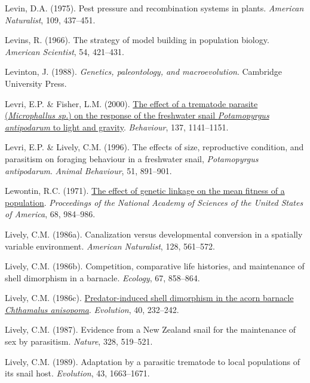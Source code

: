 \documentclass[
  american,
  letterpaper,
]{book}
\newlength{\cslhangindent}
\newenvironment{CSLReferences}[2] %
 {\begin{list}{}{%
  \setlength{\itemindent}{0pt}
  \setlength{\leftmargin}{0pt}
  \setlength{\parsep}{0pt}
  \ifodd #1
   \setlength{\leftmargin}{\cslhangindent}
   \setlength{\itemindent}{-1\cslhangindent}
  \fi
  \setlength{\itemsep}{#2\baselineskip}}}
 {\end{list}}
\begin{document}
\begin{CSLReferences}{1}{0}
Levin, D.A. (1975). Pest pressure and recombination systems in plants.
\emph{American Naturalist}, 109, 437--451.

Levins, R. (1966). The strategy of model building in population biology.
\emph{American Scientist}, 54, 421--431.

Levinton, J. (1988). \emph{Genetics, paleontology, and macroevolution}.
Cambridge University Press.

Levri, E.P. \& Fisher, L.M. (2000).
\href{https://doi.org/10.1163/156853900502565}{The effect of a trematode
parasite (\emph{{M}icrophallus sp.}) {o}n the response of the freshwater
snail \emph{{P}otamopyrgus antipodarum} to light and gravity}.
\emph{Behaviour}, 137, 1141--1151.

Levri, E.P. \& Lively, C.M. (1996). The effects of size, reproductive
condition, and parasitism on foraging behaviour in a freshwater snail,
\emph{{P}otamopyrgus antipodarum}. \emph{Animal Behaviour}, 51,
891--901.

Lewontin, R.C. (1971). \href{https://doi.org/10.1073/pnas.68.5.984}{The
effect of genetic linkage on the mean fitness of a population}.
\emph{Proceedings of the National Academy of Sciences of the United
States of America}, 68, 984--986.

Lively, C.M. (1986a). Canalization versus developmental conversion in a
spatially variable environment. \emph{American Naturalist}, 128,
561--572.

Lively, C.M. (1986b). Competition, comparative life histories, and
maintenance of shell dimorphism in a barnacle. \emph{Ecology}, 67,
858--864.

Lively, C.M. (1986c).
\href{https://doi.org/10.1111/j.1558-5646.1986.tb00466.x}{Predator-induced
shell dimorphism in the acorn barnacle \emph{{C}hthamalus anisopoma}}.
\emph{Evolution}, 40, 232--242.

Lively, C.M. (1987). Evidence from a {New Zealand} snail for the
maintenance of sex by parasitism. \emph{Nature}, 328, 519--521.

Lively, C.M. (1989). Adaptation by a parasitic trematode to local
populations of its snail host. \emph{Evolution}, 43, 1663--1671.


\end{CSLReferences}
\end{document}
